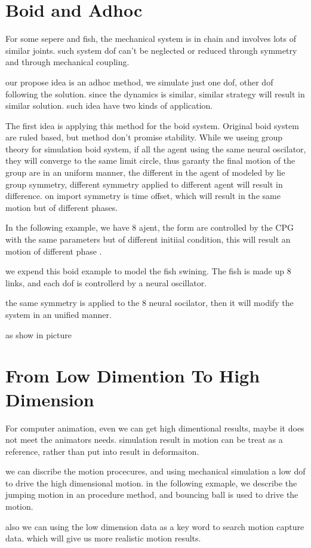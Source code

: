 \section{Boid and Adhoc}

For some sepere and fish, the mechanical system is in chain and involves lots of similar joints.
such system dof can't be neglected or reduced through symmetry and through mechanical coupling.

our propose idea is an adhoc method, we simulate just one dof, other dof following the solution.
since the dynamics is similar, similar strategy will result in similar solution.
such idea have two kinds of application.


The first idea is applying this method for the boid system.
Original boid system are ruled based, but method don't promise stability.
While we useing group theory for simulation boid system, if all the agent using the same neural oscilator, they will converge to the same limit circle,
thus garanty the final motion of the group are in an uniform manner, the different in the agent of modeled by lie group symmetry, different symmetry applied to different agent will result in
difference.
on import symmetry is time offset, which will result in the same motion but of different phases.


In the following example, we have 8 ajent,
the form are controlled by the CPG with the same parameters but of different initiial condition,
this will result an motion of different phase .


we expend this boid example to model the fish swining.
The fish is made up 8 links, and each dof is controllerd by a neural oscillator.



the same symmetry is applied to the 8 neural socilator, then it will modify the system in an unified manner.

as show in picture

\section{From Low Dimention To High Dimension}

For computer animation, even we can get high dimentional results, maybe it does not meet the animators needs.
simulation result in motion can be treat as a reference, rather than put into result in deformaiton.

we can discribe the motion procecures, and using mechanical simulation a low dof to drive the high dimensional motion.
in the following exmaple,
we describe the jumping motion in an procedure method,
and bouncing ball is used to drive the motion.


also we can using the low dimension data as a key word to search motion capture data.
which will give us more realistic motion results.


